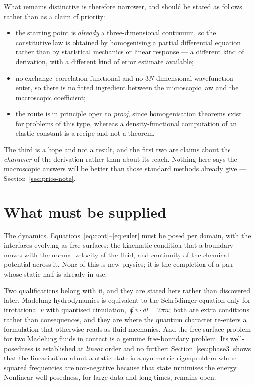 \documentclass[11pt]{article}
\begin{document}
What remains distinctive is therefore narrower, and should be stated as follows rather than as a
claim of priority:
\begin{itemize}\itemsep3pt
\item the starting point is \emph{already} a three-dimensional continuum, so the constitutive law
is obtained by homogenising a partial differential equation rather than by statistical mechanics or
linear response --- a different kind of derivation, with a different kind of error estimate
available;
\item no exchange--correlation functional and no $3N$-dimensional wavefunction enter, so there is no
fitted ingredient between the microscopic law and the macroscopic coefficient;
\item the route is in principle open to \emph{proof}, since homogenisation theorems exist for
problems of this type, whereas a density-functional computation of an elastic constant is a
recipe and not a theorem.
\end{itemize}
The third is a hope and not a result, and the first two are claims about the \emph{character} of the
derivation rather than about its reach. Nothing here says the macroscopic answers will be better
than those standard methods already give --- Section~\ref{sec:price-note}.

\section{What must be supplied}\label{sec:supply}

The dynamics. Equations~\eqref{eq:cont}--\eqref{eq:euler} must be posed per domain, with the
interfaces evolving as free surfaces: the kinematic condition that a boundary moves with the normal
velocity of the fluid, and continuity of the chemical potential across it. None of this is new
physics; it is the completion of a pair whose static half is already in use.

Two qualifications belong with it, and they are stated here rather than discovered later.
Madelung hydrodynamics is equivalent to the Schr\"odinger equation only for irrotational $v$ with
quantised circulation, $\oint v\cdot dl = 2\pi n$; both are extra conditions rather than
consequences, and they are where the quantum character re-enters a formulation that otherwise reads
as fluid mechanics. And the free-surface problem for two Madelung fluids in contact is a genuine
free-boundary problem. Its well-posedness is established at \emph{linear} order and no further:
Section~\ref{sec:phase3} shows that the linearisation about a static state is a symmetric
eigenproblem whose squared frequencies are non-negative because that state minimises the energy.
Nonlinear well-posedness, for large data and long times, remains open.
\end{document}
